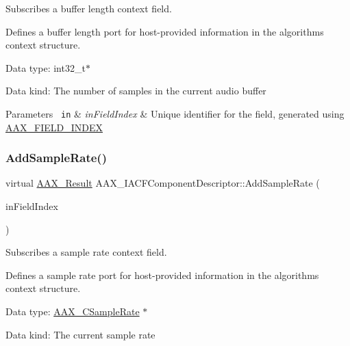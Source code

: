 Subscribes a buffer length context field. 

Defines a buffer length port for host-\/provided information in the algorithm\textquotesingle{}s context structure.


\begin{DoxyItemize}
\item Data type\+: int32\+\_\+t$\ast$
\item Data kind\+: The number of samples in the current audio buffer
\end{DoxyItemize}


\begin{DoxyParams}[1]{Parameters}
\mbox{\texttt{ in}}  & {\em in\+Field\+Index} & Unique identifier for the field, generated using \mbox{\hyperlink{a00392_acf807247ecd6e5899dc9dc31644e9a1d}{A\+A\+X\+\_\+\+F\+I\+E\+L\+D\+\_\+\+I\+N\+D\+EX}} \\
\hline
\end{DoxyParams}
\mbox{\label{a01625_aa59e93b261ae1f4951ed84b55b70742e}} 
\subsubsection{\texorpdfstring{AddSampleRate()}{AddSampleRate()}}
{\footnotesize\ttfamily virtual \mbox{\hyperlink{a00392_a4d8f69a697df7f70c3a8e9b8ee130d2f}{A\+A\+X\+\_\+\+Result}} A\+A\+X\+\_\+\+I\+A\+C\+F\+Component\+Descriptor\+::\+Add\+Sample\+Rate (\begin{DoxyParamCaption}\item[{\mbox{\hyperlink{a00392_ae807f8986143820cfb5d6da32165c9c7}{A\+A\+X\+\_\+\+C\+Field\+Index}}}]{in\+Field\+Index }\end{DoxyParamCaption})\hspace{0.3cm}{\ttfamily [pure virtual]}}



Subscribes a sample rate context field. 

Defines a sample rate port for host-\/provided information in the algorithm\textquotesingle{}s context structure.


\begin{DoxyItemize}
\item Data type\+: \mbox{\hyperlink{a00392_a3d9eea08f47e0b0a23432e15baa4e885}{A\+A\+X\+\_\+\+C\+Sample\+Rate}} $\ast$
\item Data kind\+: The current sample rate
\end{DoxyItemize}


